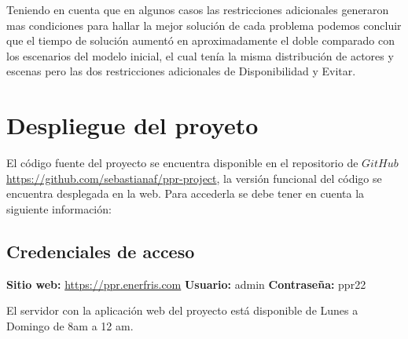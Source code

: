 \documentclass{article}
\begin{document}
Teniendo en cuenta que en algunos casos las restricciones adicionales generaron mas condiciones para hallar la mejor solución de cada problema podemos concluir que el tiempo de solución aumentó en aproximadamente el doble comparado con los escenarios del modelo inicial, el cual tenía la misma distribución de actores y escenas pero las dos restricciones adicionales de Disponibilidad y Evitar.

\section{Despliegue del proyeto}
El código fuente del proyecto se encuentra disponible en el repositorio de $GitHub$ \url{https://github.com/sebastianaf/ppr-project}, la versión funcional del código se encuentra desplegada en la web. Para accederla se debe tener en cuenta la siguiente información:\newline\newline

\subsection{Credenciales de acceso}
\textbf{Sitio web:} \url{https://ppr.enerfris.com}\newline
\textbf{Usuario:} admin\newline
\textbf{Contraseña:} ppr22
\newline\newline

El servidor con la aplicación web del proyecto está disponible de Lunes a Domingo de 8am a 12 am.
\end{document}
